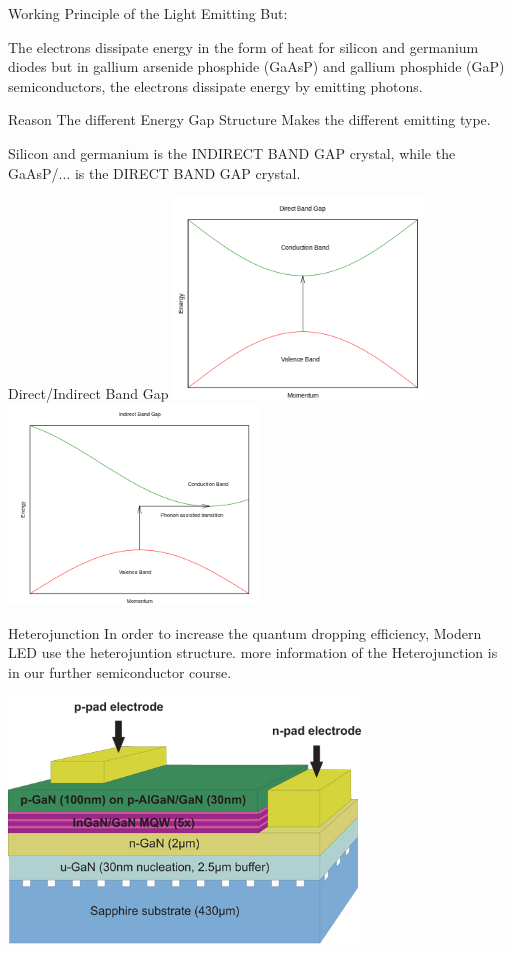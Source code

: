 \documentclass[english]{beamer}
\begin{document}
\begin{frame}{Working Principle of the Light Emitting}
	But:
	
	The electrons dissipate energy in the form of heat for silicon and germanium diodes but in gallium arsenide phosphide (GaAsP) and gallium phosphide (GaP) semiconductors, the electrons dissipate energy by emitting photons.
\end{frame}
\begin{frame}{Reason}
	The different Energy Gap Structure Makes the different emitting type.
	
	Silicon and germanium is the INDIRECT BAND GAP crystal, while the GaAsP/... is the DIRECT BAND GAP crystal.
\end{frame}
\begin{frame}{Direct/Indirect Band Gap}
	\includegraphics[width=0.5\textwidth]{f3.png}
	\includegraphics[width=0.5\textwidth]{f2.png}
\end{frame}
\begin{frame}{Heterojunction}
	In order to increase the quantum dropping efficiency, Modern LED use the heterojuntion structure. more information of the Heterojunction is in our further semiconductor course.
	
	\includegraphics[width=0.7\textwidth]{f5}
\end{frame}
\end{document}

